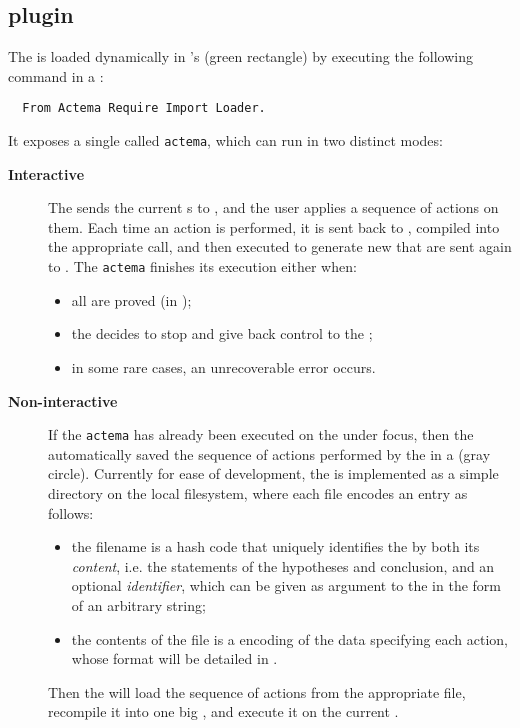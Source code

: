 \subsection{ plugin}

The  is loaded dynamically in 's  (green
rectangle) by executing the following command in a :
\begin{verbatim}
  From Actema Require Import Loader.
\end{verbatim}
It exposes a single  called \texttt{actema}, which can run in two
distinct modes:
\begin{description}
  \item[\bfseries Interactive] The  sends the current
  s to , and the user applies a sequence of actions on
  them. Each time an action is performed, it is sent back to , compiled
  into the appropriate  call, and then executed to generate new
   that are sent again to . The \texttt{actema}
   finishes its execution either when:
  \begin{itemize}
    \item all  are proved (in );
    \item the  decides to stop and give back control to the
    ;
    \item in some rare cases, an unrecoverable error occurs.
  \end{itemize}

  \item[\bfseries Non-interactive] If the \texttt{actema}  has
  already been executed on the  under focus, then the
   automatically saved the sequence of actions performed by the
   in a  (gray circle). Currently for ease of
  development, the  is implemented as a simple directory on
  the local filesystem, where each file encodes an entry as follows:
  \begin{itemize}
    \item the filename is a hash code that uniquely identifies the  by both
    its \emph{content}, i.e. the statements of the hypotheses and conclusion,
    and an optional \emph{identifier}, which can be given as argument to the
     in the form of an arbitrary string;
    \item the contents of the file is a  encoding of
    the data specifying each action, whose format will be detailed in
    .
  \end{itemize}
  Then the  will load the sequence of actions from the appropriate file,
  recompile it into one big , and execute it on the current .
\end{description}
